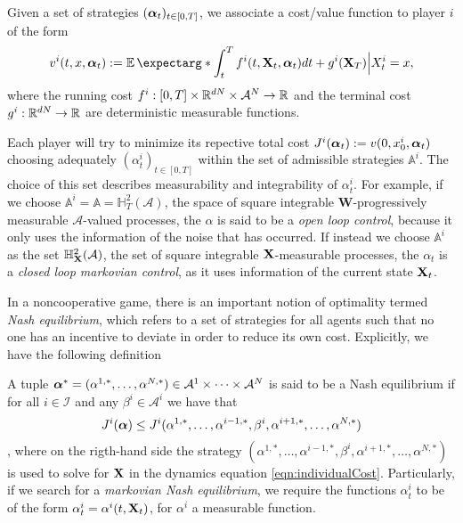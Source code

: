 Given a set of strategies $(\bm{\alpha}_t)_{t\in [0,T]}$, we associate a cost/value function to player $i$ of the form
\begin{equation}
	\label{eqn:individualCost}
	v^i(t,x,\bfAlp_t):=\expect*{\int_{t}^{T}f^i(t,\bfX_t,\bfAlp_t)dt +g^i(\bfX_T)\Big| X_t^i=x},
\end{equation}
where the running cost $f^i:[0,T]\times \mathbb{R}^{dN}\times \mathcal{A}^N\to \mathbb{R}$ and the terminal cost $g^i:\mathbb{R}^{dN}\to \mathbb{R}$ are deterministic measurable functions.

Each player will try to minimize its repective total cost $J^i(\bm{\alpha}_t):=v(0,x^i_0,\bm{\alpha}_t)$ choosing adequately $(\alpha^{i}_t)_{t\in[0,T]}$ within the set of admissible strategies $\mathbb{A}^i$. The choice of this set describes measurability and integrability of $\alpha_t^i$. For example, if we choose $\mathbb{A}^i=\mathbb{A}=\mathbb{H}^2_T(\mathcal{A})$, the space of square integrable $\bm{W}$-progressively measurable $\mathcal{A}$-valued processes, the $\alpha$ is said to be a \textit{open loop control}, because it only uses the information of the noise that has occurred. If instead we choose $\mathbb{A}^i$ as the set $\mathbb{H}_{\mathbf{X}}^2(\mathcal{A})$, the set of square integrable  $\mathbf{X}$-measurable processes, the $\alpha_t$ is a \textit{closed loop markovian control}, as it uses information of the current state $\mathbf{X}_t$.

In a noncooperative game, there is an important notion of optimality termed \textit{Nash equilibrium}, which refers to a set of strategies for all agents such that no one has an incentive to deviate in order to reduce its own cost. Explicitly, we have the following definition
\begin{definition}
A tuple $\bm{\alpha}^*=(\alpha^{1,*},\ldots,\alpha^{N,*})\in \mathcal{A}^1\times \cdots \times \mathcal{A}^N$ is said to be a Nash equilibrium if for all $i\in\mathcal{I}$ and any $\beta^i\in\mathcal{A}^i$ we have that
 $$J^{i}(\bm{\alpha})\leq J^i(\alpha^{1,*},\ldots,\alpha^{i-1,*},\beta^i,\alpha^{i+1,*},\ldots ,\alpha^{N,*})$$,
 where on the rigth-hand side the strategy $(\alpha^{1,*},\ldots,\alpha^{i-1,*},\beta^i,\alpha^{i+1,*},\ldots ,\alpha^{N,*})$ is used to solve for $\mathbf{X}$ in the dynamics equation \eqref{eqn:individualCost}. Particularly, if we search for a \textit{markovian Nash equilibrium}, we require the functions $\alpha^i_t$ to be of the form $\alpha^i_t=\alpha^i(t,\mathbf{X}_t)$, for $\alpha^i$ a measurable function.  
\end{definition}

